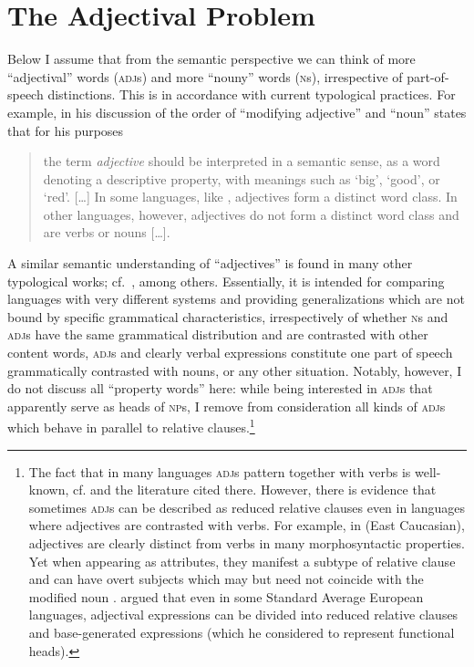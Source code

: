 \documentclass[output=paper,nobabel,draftmode  ,colorlinks, citecolor=brown]{langscibook}
\begin{document}
\section{The Adjectival Problem}\label{sec-adjprob}

Below I assume that from the semantic perspective we can think of more ``adjectival'' words (\textsc{adj}s) and more ``nouny'' words (\textsc{n}s), irrespective of part-of-speech distinctions. This is in accordance with current typological practices. For example, \citet{wals-87} in his discussion of the order of ``modifying adjective'' and ``noun'' states that for his purposes

\begin{quote}
    the term \emph{adjective} should be interpreted in a semantic sense, as a word denoting a
    descriptive property, with meanings such as `big', `good', or `red'. [\ldots] In some languages, like
    , adjectives form a distinct word class. In other languages, however, adjectives do not
    form a distinct word class and are verbs or nouns [\ldots{}]. \citep{wals-87}
\end{quote}
A similar semantic understanding of ``adjectives'' is found in many other typological works; cf.\ \citet*[670]{Haspelmath2010}, \citet*[6]{Riessler2016} among others. 
Essentially, it is intended for comparing languages with very different systems and providing generalizations which are not bound by specific grammatical characteristics, irrespectively of whether \textsc{n}s and \textsc{adj}s have the same grammatical distribution and are contrasted with other content words, \textsc{adj}s and clearly verbal expressions constitute one part of speech grammatically contrasted with nouns, or any other situation. Notably, however, I do not discuss all ``property words'' here: while being interested in \textsc{adj}s that apparently serve as heads of \textsc{np}s, I remove from consideration all kinds of \textsc{adj}s which behave in parallel to relative clauses.\footnote{The fact that in many languages \textsc{adj}s pattern together with verbs is well-known, cf. \citet{Beck2002}  and the literature cited there. However, there is evidence that sometimes \textsc{adj}s can be described as reduced relative clauses even in languages where adjectives are contrasted with verbs. For example, in  (East Caucasian), adjectives are clearly distinct from verbs in many morphosyntactic properties. Yet when appearing as attributes, they manifest a subtype of relative clause and can have overt subjects which may but need not coincide with the modified noun \citep[198--199]{Sumbatova2014}. \citet{Cinque2010} argued that even in some Standard Average European languages, adjectival expressions can be divided into reduced relative clauses and base-generated expressions (which he considered to represent functional heads).}
\end{document}

